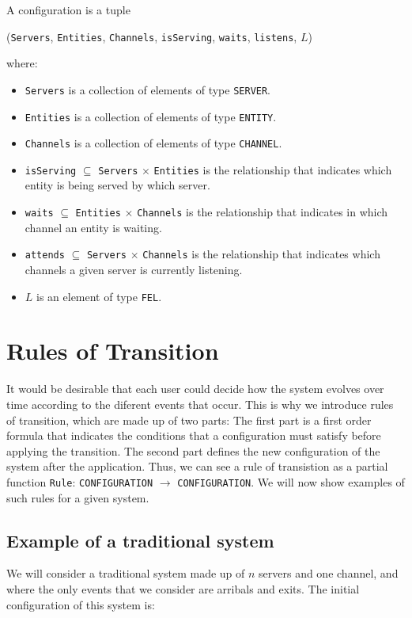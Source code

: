 \documentclass{article}
\begin{document}
A configuration is a tuple 
\begin{center}
	(\verb|Servers|, \verb|Entities|, \verb|Channels|, \verb|isServing|, \verb|waits|, \verb|listens|, $L$)
\end{center}
where:
\begin{itemize}
	\item \verb|Servers| is a collection of elements of type \verb|SERVER|. 
	\item \verb|Entities| is a collection of elements of type \verb|ENTITY|. 
	\item \verb|Channels| is a collection of elements of type \verb|CHANNEL|. 
	\item \verb|isServing| $\subseteq$ \verb|Servers| $\times$ \verb|Entities| is the relationship that indicates which entity is being served by which server. 
	\item \verb|waits| $\subseteq$ \verb|Entities| $\times$ \verb|Channels| is the relationship that indicates in which channel an entity is waiting. 
	\item \verb|attends| $\subseteq$ \verb|Servers| $\times$ \verb|Channels| is the relationship that indicates which channels a given server is currently listening.  
	\item $L$ is an element of type \verb|FEL|. 
\end{itemize}

\section*{Rules of Transition}
It would be desirable that each user could decide how the system evolves over time according to the diferent events that occur. This is why we introduce rules of transition, which are made up of two parts: The first part is a first order formula that indicates the conditions that a configuration must satisfy before applying the transition. The second part defines the new configuration of the system after the application. Thus, we can see a rule of transistion as a partial function \verb|Rule|: \verb|CONFIGURATION| $\to$ \verb|CONFIGURATION|. We will now show examples of such rules for a given system. 

\subsection*{Example of a traditional system}

We will consider a traditional system made up of $n$ servers and one channel, and where the only events that we consider are arribals and exits. The initial configuration of this system is: 
\end{document}
